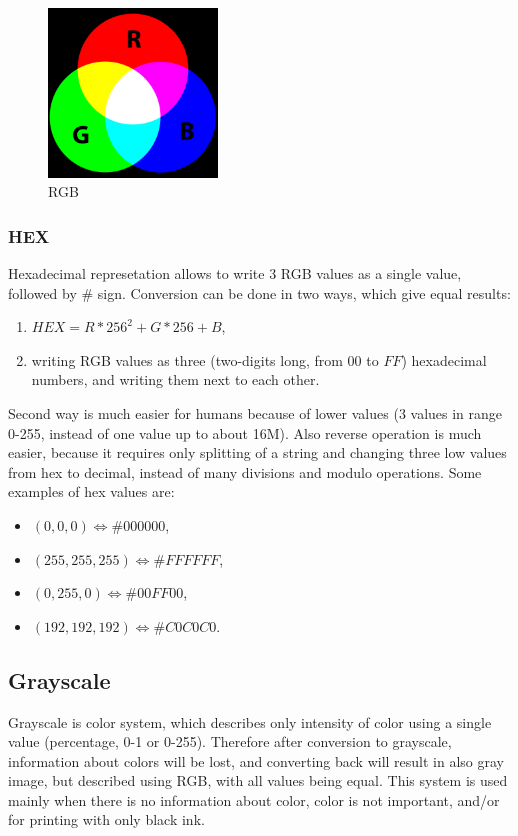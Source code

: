 \documentclass[titlepage]{article}
\begin{document}
\begin{figure}[!htb]
	\centering
	\includegraphics[width=0.4\textwidth]{img/RGB.png}
	\caption{RGB} 
	\label{fig:rgb}
\end{figure}

\subsubsection{HEX}
Hexadecimal represetation allows to write 3 RGB values as a single value,
followed by \# sign. Conversion can be done in two ways, which give equal
results:
\begin{enumerate}
  \item $HEX=R*256^2+G*256+B$,
  \item writing RGB values as three (two-digits long, from $00$ to $FF$)
  hexadecimal numbers, and writing them next to each other.
\end{enumerate}
Second way is much easier for humans because of lower values (3 values in
range 0-255, instead of one value up to about 16M). Also reverse operation
is much easier, because it requires only splitting of a string and changing
three low values from hex to decimal, instead of many divisions and modulo
operations. Some examples of hex values are:
\begin{itemize}
  \item $(0, 0, 0) \Leftrightarrow \#000000$,
  \item $(255, 255, 255) \Leftrightarrow \#FFFFFF$,
  \item $(0, 255, 0) \Leftrightarrow \#00FF00$,
  \item $(192, 192, 192) \Leftrightarrow \#C0C0C0$.
\end{itemize}

\subsection{Grayscale}
Grayscale is color system, which describes only intensity of color using a
single value (percentage, 0-1 or 0-255). Therefore after conversion to
grayscale, information about colors will be lost, and converting back will
result in also gray image, but described using RGB, with all values being equal.
This system is used mainly when there is no information about color, color is
not important, and/or for printing with only black ink.
\end{document}
